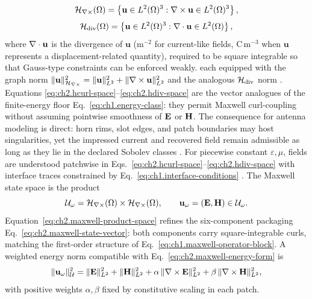 \begin{equation}
\label{eq:ch2.hcurl-space}
\mathcal{H}_{\nabla\times}(\Omega)
=
\left\{
\mathbf{u}\in L^{2}(\Omega)^{3}:
\nabla\times\mathbf{u}\in L^{2}(\Omega)^{3}
\right\},
\end{equation}
\begin{equation}
\label{eq:ch2.hdiv-space}
\mathcal{H}_{\mathrm{div}}(\Omega)
=
\left\{
\mathbf{u}\in L^{2}(\Omega)^{3}:
\nabla\cdot\mathbf{u}\in L^{2}(\Omega)
\right\},
\end{equation}
where \(\nabla\cdot\mathbf{u}\) is the divergence of \(\mathbf{u}\) (m\(^{-2}\) for current-like
fields, C\,m\(^{-3}\) when \(\mathbf{u}\) represents a displacement-related quantity),
required to be square integrable so that Gauss-type constraints can be enforced
weakly.
each equipped with the graph norm
\(\|\mathbf{u}\|_{\mathcal{H}_{\nabla\times}}^{2}=\|\mathbf{u}\|_{L^{2}}^{2}+\|\nabla\times\mathbf{u}\|_{L^{2}}^{2}\)
and the analogous \(\mathcal{H}_{\mathrm{div}}\) norm \cite{stratton1941}. Equations
\eqref{eq:ch2.hcurl-space}--\eqref{eq:ch2.hdiv-space} are the vector analogues of
the finite-energy floor Eq.~\eqref{eq:ch1.energy-class}: they permit Maxwell
curl-coupling without assuming pointwise smoothness of \(\mathbf{E}\) or \(\mathbf{H}\). The consequence
for antenna modeling is direct: horn rims, slot edges, and patch boundaries may host
singularities, yet the impressed current and recovered field remain admissible as long as
they lie in the declared Sobolev classes \cite{harrington2001}. For
piecewise constant \(\varepsilon,\mu\), fields are understood patchwise in
Eqs.~\eqref{eq:ch2.hcurl-space}--\eqref{eq:ch2.hdiv-space} with interface traces
constrained by Eq.~\eqref{eq:ch1.interface-conditions} \cite{harrington2001}.
The Maxwell state space is the product
\begin{equation}
\label{eq:ch2.maxwell-product-space}
\mathcal{U}_\omega
=
\mathcal{H}_{\nabla\times}(\Omega)\times\mathcal{H}_{\nabla\times}(\Omega),
\qquad
\mathbf{u}_\omega=(\mathbf{E},\mathbf{H})\in\mathcal{U}_\omega.
\end{equation}
Equation~\eqref{eq:ch2.maxwell-product-space} refines the six-component packaging
Eq.~\eqref{eq:ch2.maxwell-state-vector}: both components carry square-integrable
curls, matching the first-order structure of
Eq.~\eqref{eq:ch1.maxwell-operator-block}. A weighted energy norm compatible with
Eq.~\eqref{eq:ch2.maxwell-energy-form} is
\begin{equation}
\label{eq:ch2.field-energy-norm}
\|\mathbf{u}_\omega\|_{\mathcal{U}}^{2}
=
\|\mathbf{E}\|_{L^{2}}^{2}+\|\mathbf{H}\|_{L^{2}}^{2}
+\alpha\,\|\nabla\times\mathbf{E}\|_{L^{2}}^{2}+\beta\,\|\nabla\times\mathbf{H}\|_{L^{2}}^{2},
\end{equation}
with positive weights \(\alpha,\beta\) fixed by constitutive scaling in each patch.
